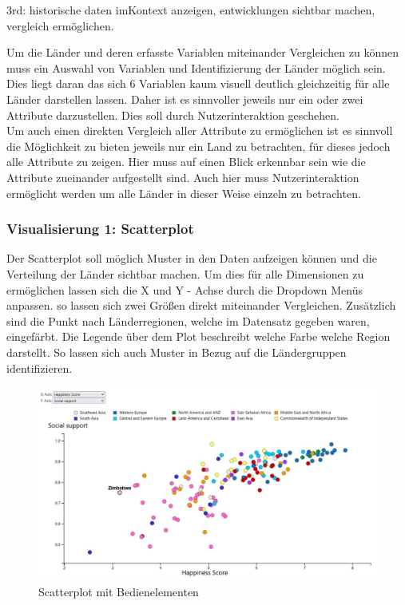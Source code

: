3rd: historische daten imKontext anzeigen, entwicklungen sichtbar machen, vergleich ermöglichen. 

Um die Länder und deren erfasste Variablen miteinander Vergleichen zu können muss ein Auswahl von Variablen und Identifizierung der Länder möglich sein. Dies liegt daran das sich 6 Variablen kaum visuell deutlich gleichzeitig für alle Länder darstellen lassen. Daher ist es sinnvoller jeweils nur ein oder zwei Attribute darzustellen. Dies soll durch Nutzerinteraktion geschehen. \\

Um auch einen direkten Vergleich aller Attribute zu ermöglichen ist es sinnvoll die Möglichkeit zu bieten jeweils nur ein Land zu betrachten, für dieses jedoch alle Attribute zu zeigen. Hier muss auf einen Blick erkennbar sein wie die Attribute zueinander aufgestellt sind. Auch hier muss Nutzerinteraktion ermöglicht werden um alle Länder in dieser Weise einzeln zu betrachten. \\

\subsubsection{Visualisierung 1: Scatterplot}

Der Scatterplot soll möglich Muster in den Daten aufzeigen können und die Verteilung der Länder sichtbar machen. Um dies für alle Dimensionen zu ermöglichen lassen sich die X und Y - Achse durch die Dropdown Menüs anpassen. so lassen sich zwei Größen direkt miteinander Vergleichen. Zusätzlich sind die Punkt nach Länderregionen, welche im Datensatz gegeben waren, eingefärbt. Die Legende über dem Plot beschreibt welche Farbe welche Region darstellt. So lassen sich auch Muster in Bezug auf die Ländergruppen identifizieren. \\

\begin{figure}[h]
 \centering
 \includegraphics[width = \textwidth]{img/scatterplot.jpg}
 \caption{Scatterplot mit Bedienelementen}
 \label{fig:scatterplot}
\end{figure}

